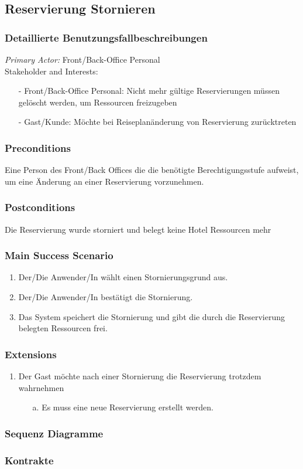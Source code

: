 \documentclass[./detailed_overview_usecases.tex]{subfiles}
\begin{document}
    \subsection{Reservierung Stornieren}
    \subsubsection{Detaillierte Benutzungsfallbeschreibungen}
    \textit{Primary Actor:}
    Front/Back-Office Personal
    \\
    Stakeholder and Interests:
    \begin{itemize}
        \item[-] Front/Back-Office Personal: Nicht mehr gültige Reservierungen müssen gelöscht werden, um Ressourcen freizugeben
        \item[-] Gast/Kunde: Möchte bei Reiseplanänderung von Reservierung zurücktreten
    \end{itemize}

    \subsubsection*{Preconditions}
    Eine Person des Front/Back Offices die die benötigte Berechtigungsstufe aufweist, um eine Änderung an einer Reservierung vorzunehmen.

    \subsubsection*{Postconditions}
    Die Reservierung wurde storniert und belegt keine Hotel Ressourcen mehr

    \subsubsection*{Main Success Scenario}
    \begin{enumerate}
        \item Der/Die Anwender/In wählt einen Stornierungsgrund aus.
        \item Der/Die Anwender/In bestätigt die Stornierung.
        \item Das System speichert die Stornierung und gibt die durch die Reservierung belegten Ressourcen frei.
    \end{enumerate}

    \subsubsection*{Extensions}
    \begin{enumerate}
        \item Der Gast möchte nach einer Stornierung die Reservierung trotzdem wahrnehmen
        \begin{itemize}
            \item[a.] Es muss eine neue Reservierung erstellt werden.
        \end{itemize}
    \end{enumerate}

    \subsubsection{Sequenz Diagramme}
    \subsubsection{Kontrakte}
\end{document}
